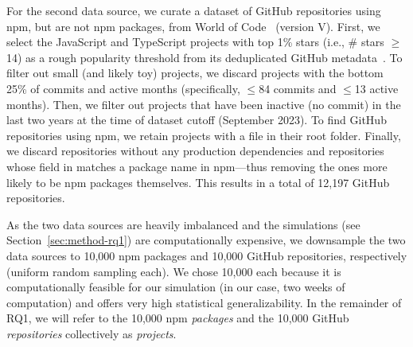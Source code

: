 For the second data source, we curate a dataset of GitHub repositories using npm, but are not npm packages, from World of Code~\cite{DBLP:journals/ese/MaDBAVTKZM21} (version V).
First, we select the JavaScript and TypeScript projects with top 1\% stars (i.e., \# stars $\ge$ 14) as a rough popularity threshold from its deduplicated GitHub metadata~\cite{DBLP:conf/msr/SpinellisKM20}.
To filter out small (and likely toy) projects, we discard projects with the bottom 25\% of commits and active months (specifically, $\le$84 commits and $\le$13 active months).
Then, we filter out projects that have been inactive (no commit) in the last two years at the time of dataset cutoff (September 2023).
To find GitHub repositories using npm, we retain projects with a  file in their root folder. 
Finally, we discard repositories without any production dependencies and repositories whose  field in  matches a package name in npm---thus removing the ones more likely to be npm packages themselves.
This results in a total of 12,197 GitHub repositories.

As the two data sources are heavily imbalanced and the simulations (see Section~\ref{sec:method-rq1}) are computationally expensive, we downsample the two data sources to 10,000 npm packages and 10,000 GitHub repositories, respectively (uniform random sampling each).
We chose 10,000 each because it is computationally feasible for our simulation (in our case, two weeks of computation) and offers very high statistical generalizability.
In the remainder of RQ1, we will refer to the 10,000 npm \textit{packages} and the 10,000 GitHub \textit{repositories} collectively as \emph{projects}.

